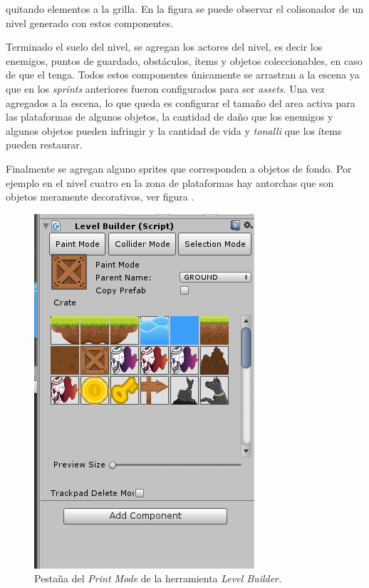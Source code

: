 quitando elementos a la grilla. En la figura se puede observar el colisonador de 
un nivel generado con estos componentes.
\\
\par
Terminado el suelo del nivel, se agregan los actores del nivel, es decir los enemigos, puntos de guardado, obstáculos, ítems y objetos coleccionables, en caso de que el tenga. Todos estos componentes únicamente se arrastran a la escena ya que en los \textit{sprints} anteriores fueron configurados para ser \textit{assets}. Una vez agregados a la escena, lo que queda es configurar el tamaño del area activa para las plataformas de algunos objetos, la cantidad de daño que los enemigos y algunos objetos pueden infringir y la cantidad de vida y \textit{tonalli} que los ítems pueden restaurar. 
\\
\par
Finalmente se agregan alguno sprites que corresponden a objetos de fondo. Por ejemplo en el nivel cuatro en la zona de plataformas hay antorchas que son objetos meramente decorativos, ver figura .

\begin{figure}[h]
		\centering
		\includegraphics[height=0.2 \textheight]{03TrabajoRealizado/imagenes/levelBuilder02.png}
		\caption{Pestaña del \textit{Print Mode} de la herramienta \textit{Level 
		Builder.}}
		\label{fig:LevelBuilder}
\end{figure}

